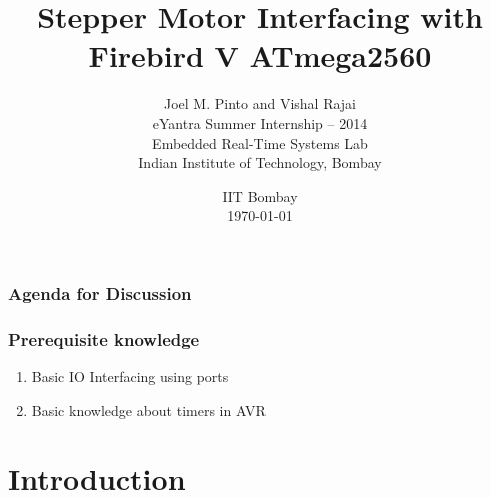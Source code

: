 \documentclass[table,10pt,red]{beamer}	%
\title
[
	Firebird ATmega2560 Robotics Research Platform	%
	\hspace{0.5cm}
	\insertframenumber/\inserttotalframenumber
]
{
	Stepper Motor Interfacing with Firebird V ATmega2560
}
\author
[
	www.e-yantra.org 	%
]
{
  Joel M. Pinto and Vishal Rajai\\
  eYantra Summer Internship -- 2014\\
  Embedded Real-Time Systems Lab\\
  Indian Institute of Technology, Bombay\\
}
\date
{
IIT Bombay \\ {\today}	%
}
\begin{document}
\begin{frame}
	\titlepage
\end{frame}

\begin{frame}
	\frametitle{Agenda for Discussion}
	
	\tableofcontents
\end{frame}


\begin{frame}
	\frametitle{Prerequisite knowledge}
	\begin{enumerate}
		\item Basic IO Interfacing using ports
		\item Basic knowledge about timers in AVR
	\end{enumerate}
\end{frame}

\section{Introduction}
\end{document}
